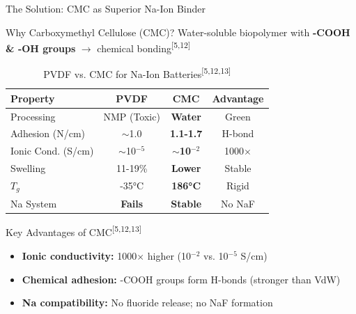 \documentclass[aspectratio=169]{beamer}
\begin{document}
\begin{frame}{The Solution: CMC as Superior Na-Ion Binder}
    \vspace{-0.3cm}
    \begin{block}{Why Carboxymethyl Cellulose (CMC)?}
        \footnotesize Water-soluble biopolymer with \textbf{-COOH \& -OH groups} $\rightarrow$ chemical bonding\textsuperscript{[5,12]}
    \end{block}
    
    \vspace{-0.25cm}
    \begin{table}
        \caption{PVDF vs. CMC for Na-Ion Batteries\textsuperscript{[5,12,13]}}
        \centering\tiny
        \begin{tabular}{lccc}
            \toprule
            \textbf{Property} & \textbf{PVDF} & \textbf{CMC} & \textbf{Advantage} \\
            \midrule
            Processing & NMP (Toxic) & \textcolor{HighlightGreen}{\textbf{Water}} & \textcolor{HighlightGreen}{Green} \\
            Adhesion (N/cm) & $\sim$1.0 & \textcolor{HighlightGreen}{\textbf{1.1-1.7}} & \textcolor{HighlightGreen}{H-bond} \\
            Ionic Cond. (S/cm) & $\sim$10$^{-5}$ & \textcolor{HighlightGreen}{\textbf{$\sim$10$^{-2}$}} & \textcolor{HighlightGreen}{1000$\times$} \\
            Swelling & 11-19\% & \textcolor{HighlightGreen}{\textbf{Lower}} & \textcolor{HighlightGreen}{Stable} \\
            $T_g$ & -35\si{\celsius} & \textcolor{HighlightGreen}{\textbf{186\si{\celsius}}} & \textcolor{HighlightGreen}{Rigid} \\
            Na System & \textcolor{AlertRed}{\textbf{Fails}} & \textcolor{HighlightGreen}{\textbf{Stable}} & \textcolor{HighlightGreen}{No NaF} \\
            \bottomrule
        \end{tabular}
    \end{table}
    
    \vspace{-0.2cm}
    \begin{exampleblock}{Key Advantages of CMC\textsuperscript{[5,12,13]}}
        \footnotesize
        \begin{itemize}\itemsep0pt
            \item \textbf{Ionic conductivity:} 1000$\times$ higher (10$^{-2}$ vs. 10$^{-5}$ S/cm)
            \item \textbf{Chemical adhesion:} -COOH groups form H-bonds (stronger than VdW)
            \item \textbf{Na compatibility:} No fluoride release; no NaF formation
        \end{itemize}
    \end{exampleblock}
\end{frame}
\end{document}
